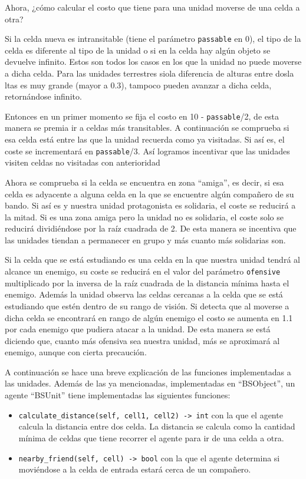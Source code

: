 Ahora, ¿cómo calcular el costo que tiene para una unidad moverse de una celda a otra?
 
Si la celda nueva es intransitable (tiene el parámetro \verb|passable| en 0), el tipo de la celda es diferente al tipo de la unidad o si en la celda hay algún objeto se devuelve infinito. Estos son todos los casos en los que la unidad no puede moverse a dicha celda. Para las unidades terrestres siola diferencia de alturas entre dosla ltas es muy grande (mayor a 0.3), tampoco pueden avanzar a dicha celda, retornándose infinito. 
 
Entonces en un primer momento se fija el costo en 10 - \verb|passable|/2, de esta manera se premia ir a celdas más transitables. A continuación se comprueba si esa celda está entre las que la unidad recuerda como ya visitadas. Si así es, el coste se incrementará en \verb|passable|/3. Así logramos incentivar que las unidades visiten celdas no visitadas con anterioridad  
  
Ahora se comprueba si la celda se encuentra en zona ``amiga'', es decir, si esa celda es adyacente a alguna celda en la que se encuentre algún compañero de su bando. Si así es y nuestra unidad protagonista es solidaria, el coste se reducirá a la mitad. Si es una zona amiga pero la unidad no es solidaria, el coste solo se reducirá dividiéndose por la raíz cuadrada de 2. De esta manera se incentiva que las unidades tiendan a permanecer en grupo y más cuanto más solidarias son.

Si la celda que se est\'a estudiando es una celda en la que nuestra unidad tendr\'a al alcance un enemigo, su coste se reducir\'a en el valor del par\'ametro \verb|ofensive|  multiplicado por la inversa de la ra\'iz cuadrada de la distancia m\'inima hasta el enemigo. Adem\'as la unidad observa las celdas cercanas a la celda que se est\'a estudiando que est\'en dentro de su rango de visi\'on. Si detecta que al moverse a dicha celda se encontrar\'a en rango de alg\'un enemigo el costo se aumenta en 1.1 por cada enemigo que pudiera atacar a la unidad. De esta manera se est\'a diciendo que, cuanto m\'as ofensiva sea nuestra unidad, m\'as se aproximar\'a al enemigo, aunque con cierta precauci\'on.  

A continuaci\'on se hace una breve explicaci\'on de las funciones implementadas a las unidades. Adem\'as de las  ya mencionadas, implementadas en ``BSObject'', un agente ``BSUnit'' tiene implementadas las siguientes funciones:

\begin{itemize}
	\item \verb|calculate_distance(self, cell1, cell2) -> int| con la que el agente calcula la distancia entre dos celda. La distancia se calcula como la cantidad m\'inima de celdas que tiene recorrer el agente para ir de una celda a otra.
	\item \verb|nearby_friend(self, cell) -> bool| con la que el agente determina si movi\'endose a la celda de entrada estar\'a cerca de un compa\~{n}ero. 
\end{itemize}

